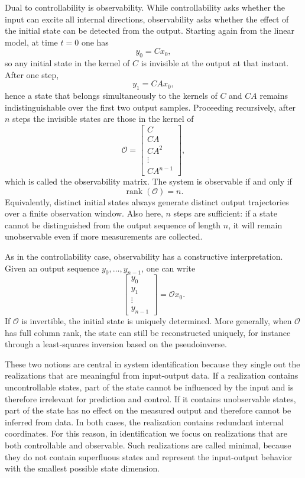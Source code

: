 Dual to controllability is observability. While controllability asks whether the input can excite all internal directions, observability asks whether the effect of the initial state can be detected from the output. Starting again from the linear model, at time \(t=0\) one has
\[
y_0 = Cx_0,
\]
so any initial state in the kernel of \(C\) is invisible at the output at that instant. After one step,
\[
y_1 = CAx_0,
\]
hence a state that belongs simultaneously to the kernels of \(C\) and \(CA\) remains indistinguishable over the first two output samples. Proceeding recursively, after \(n\) steps the invisible states are those in the kernel of
\[
\mathcal{O}=
\begin{bmatrix}
C\\
CA\\
CA^2\\
\vdots\\
CA^{n-1}
\end{bmatrix},
\]
which is called the observability matrix. The system is observable if and only if
\[
\operatorname{rank}(\mathcal{O})=n.
\]
Equivalently, distinct initial states always generate distinct output trajectories over a finite observation window. Also here, \(n\) steps are sufficient: if a state cannot be distinguished from the output sequence of length \(n\), it will remain unobservable even if more measurements are collected.

As in the controllability case, observability has a constructive interpretation. Given an output sequence \(y_0,\dots,y_{n-1}\), one can write
\[
\begin{bmatrix}
y_0\\
y_1\\
\vdots\\
y_{n-1}
\end{bmatrix}
=
\mathcal{O}x_0.
\]
If \(\mathcal{O}\) is invertible, the initial state is uniquely determined. More generally, when \(\mathcal{O}\) has full column rank, the state can still be reconstructed uniquely, for instance through a least-squares inversion based on the pseudoinverse.

These two notions are central in system identification because they single out the realizations that are meaningful from input-output data. If a realization contains uncontrollable states, part of the state cannot be influenced by the input and is therefore irrelevant for prediction and control. If it contains unobservable states, part of the state has no effect on the measured output and therefore cannot be inferred from data. In both cases, the realization contains redundant internal coordinates. For this reason, in identification we focus on realizations that are both controllable and observable. Such realizations are called minimal, because they do not contain superfluous states and represent the input-output behavior with the smallest possible state dimension.

